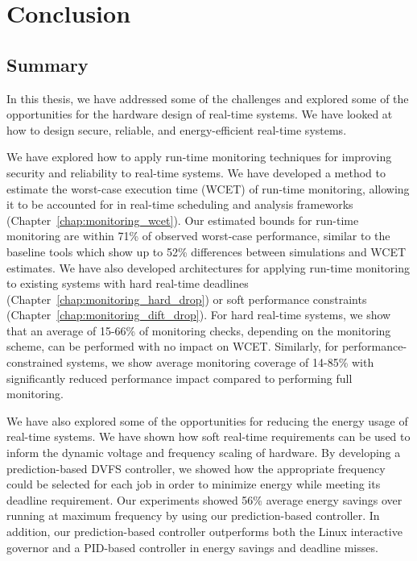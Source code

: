 \chapter{Conclusion}
\label{chap:conclusion}

\section{Summary}

In this thesis, we have addressed some of the challenges and explored some of
the opportunities for the hardware design of real-time systems. We have looked
at how to design secure, reliable, and energy-efficient real-time systems.

We have explored how to apply run-time monitoring techniques for improving
security and reliability to real-time systems. We have developed a method
to estimate the worst-case execution time (WCET) of run-time monitoring,
allowing it to be accounted for in real-time scheduling and analysis frameworks
(Chapter~\ref{chap:monitoring_wcet}). Our estimated bounds for run-time
monitoring are within 71\% of observed worst-case performance, similar to the
baseline tools which show up to 52\% differences between simulations and WCET
estimates. We have also developed architectures for applying run-time
monitoring to existing systems with hard real-time deadlines
(Chapter~\ref{chap:monitoring_hard_drop}) or soft performance constraints
(Chapter~\ref{chap:monitoring_dift_drop}). For hard real-time systems, we show
that an average of 15-66\% of monitoring checks, depending on the monitoring
scheme, can be performed with no impact on WCET. Similarly, for
performance-constrained systems, we show average monitoring coverage of 14-85\%
with significantly reduced performance impact compared to performing full
monitoring.

We have also explored some of the opportunities for reducing the energy usage
of real-time systems. We have shown how soft real-time requirements can be used
to inform the dynamic voltage and frequency scaling of hardware. By developing
a prediction-based DVFS controller, we showed how the appropriate frequency
could be selected for each job in order to minimize energy while meeting its
deadline requirement.  Our experiments showed 56\% average energy savings over
running at maximum frequency by using our prediction-based controller. In
addition, our prediction-based controller outperforms both the Linux
interactive governor and a PID-based controller in energy savings and deadline
misses.

